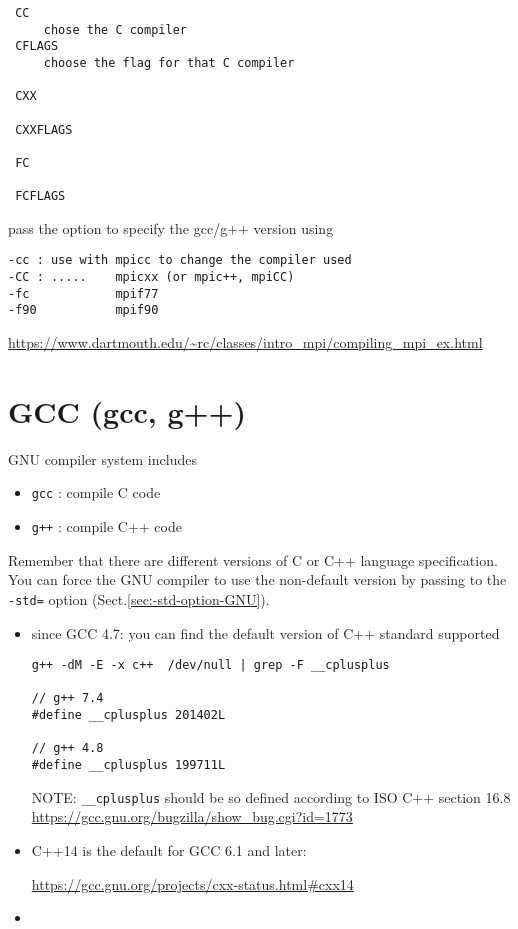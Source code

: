 \begin{enumerate}
\begin{verbatim}
 CC
     chose the C compiler
 CFLAGS
     choose the flag for that C compiler
     
 CXX
 
 CXXFLAGS
 
 FC
 
 FCFLAGS
 \end{verbatim}
 
pass the option to specify the
gcc/g++ version using
\begin{verbatim}
-cc : use with mpicc to change the compiler used
-CC : .....    mpicxx (or mpic++, mpiCC)
-fc            mpif77
-f90           mpif90
\end{verbatim}
\url{https://www.dartmouth.edu/~rc/classes/intro_mpi/compiling_mpi_ex.html}

\end{enumerate}

\section{GCC (gcc, g++)}
\label{sec:GCC}
\label{sec:g++}

GNU compiler system includes
\begin{itemize}
  \item  \verb!gcc! : compile C code
  \item  \verb!g++! : compile C++ code
\end{itemize}

Remember that there are different versions of C or C++ language specification. 
You can force the GNU compiler to use the non-default version by passing to the 
\verb!-std=! option (Sect.\ref{sec:-std-option-GNU}).
\begin{itemize}
  \item since GCC 4.7:  you can find the default version of C++ standard supported
  
\begin{verbatim}
g++ -dM -E -x c++  /dev/null | grep -F __cplusplus

// g++ 7.4
#define __cplusplus 201402L

// g++ 4.8
#define __cplusplus 199711L
\end{verbatim}

NOTE: \verb!__cplusplus! should be so defined
according to ISO C++ section 16.8 
\url{https://gcc.gnu.org/bugzilla/show_bug.cgi?id=1773}

   \item C++14 is the default for GCC 6.1 and later:
   
   \url{https://gcc.gnu.org/projects/cxx-status.html#cxx14}
   
   \item 
\end{itemize}

